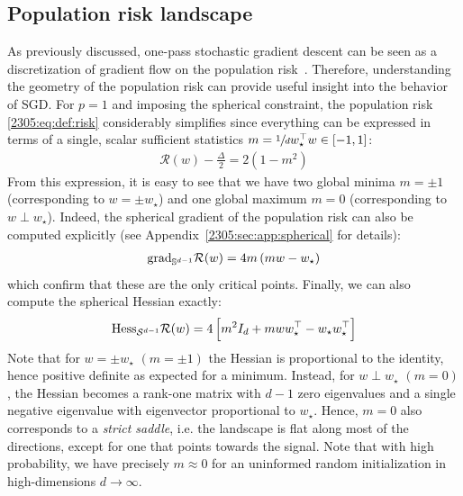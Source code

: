 \subsection{Population risk landscape}
As previously discussed, one-pass stochastic gradient descent can be seen as a discretization of gradient flow on the population risk~\cite{robbins1951stochastic}. Therefore, understanding the geometry of the population risk can provide useful insight into the behavior of SGD. For $p=1$ and imposing the spherical constraint, the population risk \eqref{2305:eq:def:risk} considerably simplifies since everything can be expressed in terms of a single, scalar sufficient statistics $m =\sfrac{1}{d} w_{\star}^{\top}w\in[-1,1]$:
\begin{align}
    \mathcal{R}(w) - \frac{\Delta}{2} = 2(1-m^2)
\end{align}
From this expression, it is easy to see that we have two global minima $m=\pm 1$ (corresponding to $w=\pm w_{\star}$) and one global maximum $m=0$ (corresponding to $w\perp w_{\star}$). Indeed, the spherical gradient of the population risk can also be computed explicitly (see Appendix~\ref{2305:sec:app:spherical} for details):
\begin{align}
   {\rm grad}_{\mathbb{S}^{d-1}}\mathcal{R}(w) = 4m\left(m w-w_{\star}\right)
\end{align}
 which confirm that these are the only critical points. Finally, we can also compute the spherical Hessian exactly: 
\begin{align}
 {\rm Hess}_{\mathcal{S}^{d-1}}\mathcal{R}(w) = 4\left[m^2 I_{d}+m w w_{\star}^{\top}-w_{\star}w_{\star}^{\top}\right]
\end{align}
Note that for $w=\pm w_{\star}$ $(m=\pm 1)$ the Hessian is proportional to the identity, hence positive definite as expected for a minimum. Instead, for $w \perp w_{\star}$ $(m=0)$, the Hessian becomes a rank-one matrix with $d-1$ zero eigenvalues and a single negative eigenvalue with eigenvector proportional to $w_{\star}$. Hence, $m=0$ also corresponds to a \emph{strict saddle}, i.e. the landscape is flat along most of the directions, except for one that points towards the signal. Note that with high probability, we have precisely $m\approx 0$ for an uninformed random initialization in high-dimensions $d\to\infty$.

